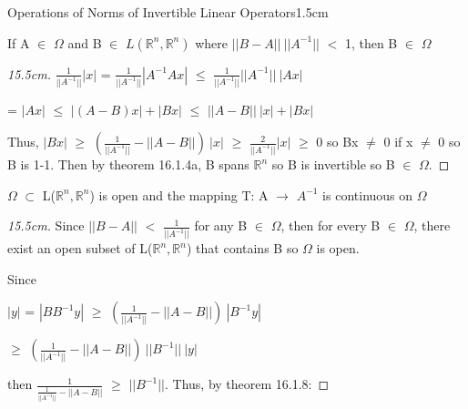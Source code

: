     \begin{ltheorem}{Operations of Norms of Invertible Linear Operators}{1.5cm}
        \item If A $\in$ $\Omega$ and B $\in$ $L(\mathbb{R}^n,\mathbb{R}^n)$
            where $||B-A|| \ ||A^{-1}||$ $<$ 1, then B $\in$ $\Omega$

            \begin{proof}[15.5cm]
                $\frac{1}{||A^{-1}||} |x|$
                = $\frac{1}{||A^{-1}||} |A^{-1}Ax|$
                $\leq$ $\frac{1}{||A^{-1}||} ||A^{-1}|| \ |Ax|$

                \hspace{1.4cm}
                = $|Ax|$
                $\leq$ $|(A-B)x| + |Bx|$
                $\leq$ $||A-B|| \ |x| + |Bx|$

                Thus,
                $|Bx|$
                $\geq$ $(\frac{1}{||A^{-1}||} - ||A-B||) \ |x|$
                $\geq$ $\frac{2}{||A^{-1}||} |x|$ $\geq$ 0
                so Bx $\not =$ 0 if x $\not =$ 0
                so B is 1-1.
                Then by {\color{red} theorem 16.1.4a}, B spans $\mathbb{R}^n$
                so B is invertible so B $\in$ $\Omega$. 
            \end{proof}

        \item $\Omega$ $\subset$ L($\mathbb{R}^n,\mathbb{R}^n$) is open
            and the mapping T: A $\rightarrow$ $A^{-1}$ is continuous on $\Omega$

            \begin{proof}[15.5cm]
                Since $||B-A||$ $<$ $\frac{1}{||A^{-1}||}$ for any B $\in$ $\Omega$,
                then for every B $\in$ $\Omega$, there exist an open subset
                of L($\mathbb{R}^n,\mathbb{R}^n$) that contains B
                so $\Omega$ is open.
                
                Since

                \hspace{0.5cm}
                $|y|$ = $|BB^{-1}y|$
                $\geq$ $(\frac{1}{||A^{-1}||} - ||A-B||) \ |B^{-1}y|$
                
                \hspace{1.1cm}
                $\geq$ $(\frac{1}{||A^{-1}||} - ||A-B||) \ ||B^{-1}|| \ |y|$

                then $\frac{1}{\frac{1}{||A^{-1}||} - ||A-B||}$ $\geq$ $||B^{-1}||$.
                Thus, by {\color{red} theorem 16.1.8}:


\end{proof}
\end{ltheorem}
